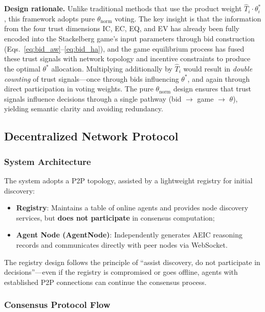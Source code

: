 \documentclass[12pt,a4paper]{article}
\begin{document}
\textbf{Design rationale.} Unlike traditional methods that use the product weight $\hat{T}_i \cdot \theta_i^*$, this framework adopts pure $\theta_{\text{norm}}$ voting. The key insight is that the information from the four trust dimensions IC, EC, EQ, and EV has already been fully encoded into the Stackelberg game's input parameters through bid construction (Eqs.~\eqref{eq:bid_aw}--\eqref{eq:bid_ha}), and the game equilibrium process has fused these trust signals with network topology and incentive constraints to produce the optimal $\theta^*$ allocation. Multiplying additionally by $\hat{T}_i$ would result in \textit{double counting} of trust signals---once through bids influencing $\theta^*$, and again through direct participation in voting weights. The pure $\theta_{\text{norm}}$ design ensures that trust signals influence decisions through a single pathway (bid $\to$ game $\to$ $\theta$), yielding semantic clarity and avoiding redundancy.

\subsection{Decentralized Network Protocol}\label{sec:network}

\subsubsection{System Architecture}

The system adopts a P2P topology, assisted by a lightweight registry for initial discovery:
\begin{itemize}[nosep]
    \item \textbf{Registry}: Maintains a table of online agents and provides node discovery services, but \textbf{does not participate} in consensus computation;
    \item \textbf{Agent Node (AgentNode)}: Independently generates AEIC reasoning records and communicates directly with peer nodes via WebSocket.
\end{itemize}

The registry design follows the principle of ``assist discovery, do not participate in decisions''---even if the registry is compromised or goes offline, agents with established P2P connections can continue the consensus process.

\subsubsection{Consensus Protocol Flow}
\end{document}
